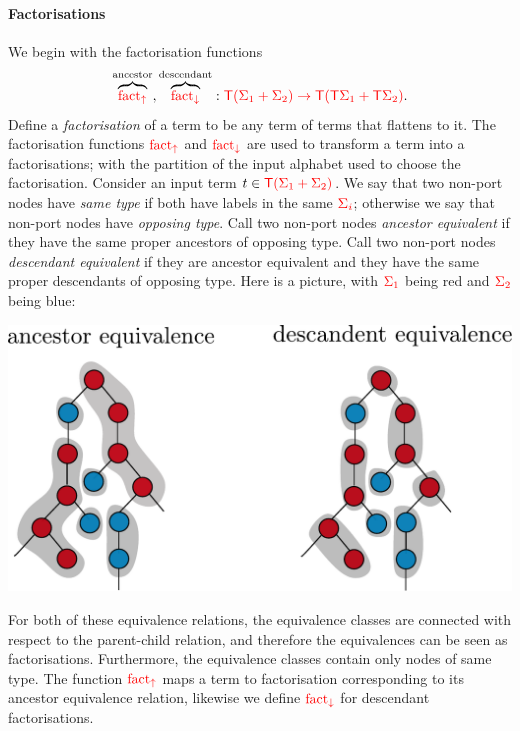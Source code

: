 \paragraph*{Factorisations}
We begin with the factorisation functions 
\begin{align*}
    \overbrace{{\color{red}{\mathrm{fact_{\uparrow}}}}}^{\text{ancestor}}, \overbrace{{\color{red}{\mathrm{fact_{\downarrow}}}}}^{\text{descendant}}  : {\color{red}{{\color{red}{\mathsf T}}(\Sigma_1+\Sigma_2) \to {\color{red}{\mathsf T}}({\color{red}{\mathsf T}}\Sigma_1 + {\color{red}{\mathsf T}}\Sigma_2)}}.
\end{align*}
Define a \emph{factorisation} of a term   to be any term of terms that flattens to it. 
The factorisation functions ${\color{red}{\mathrm{fact_{\uparrow}}}}$ and ${\color{red}{\mathrm{fact_{\downarrow}}}}$ are used to transform a term  into a factorisations; with the partition of the input alphabet used to choose the factorisation.  Consider an input term $t \in {\color{red}{{\color{red}{\mathsf T}}({\color{red}{\Sigma}}_1 + {\color{red}{\Sigma}}_2)}}$.
        We say that two non-port nodes have \emph{same type} if both have labels in the same  ${\color{red}{\Sigma_i}}$; otherwise we say that non-port nodes have \emph{opposing type}.  Call two non-port nodes \emph{ancestor equivalent}  if they have the same proper ancestors of opposing type. Call two non-port nodes \emph{descendant equivalent}  if they  are ancestor equivalent and they have the same proper descendants of opposing type. Here is a picture, with ${\color{red}{\Sigma_1}}$ being red and ${\color{red}{\Sigma_2}}$ being blue: 
        \begin{center}
      \includegraphics[scale=.3]{facto-up-down.pdf}
        \end{center}
        For both of these equivalence relations, the equivalence classes are connected with respect to the parent-child relation, and therefore the equivalences can be seen as factorisations. Furthermore, the equivalence classes contain only nodes of same type.  The function ${\color{red}{\mathrm{fact_{\uparrow}}}}$ maps a term to factorisation corresponding to its ancestor equivalence relation, likewise we define ${\color{red}{\mathrm{fact_{\downarrow}}}}$ for  descendant factorisations.
    
